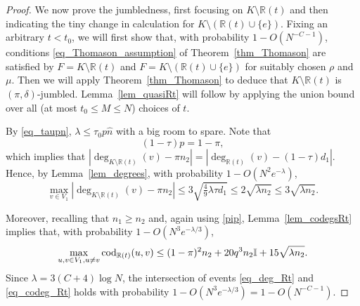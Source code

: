 \documentclass[12pt,reqno]{amsart}
\newcommand{\R} {\mathbb R}
\newcommand{\I} {\mathbb I}
\newcommand{\cod}{\operatorname{cod}}
\theoremstyle{definition}
\begin{document}
\begin{proof}
\smallskip
We now prove the jumbledness, first focusing on $K \setminus \R(t)$ and then indicating the tiny change in calculation for $K \setminus (\R(t) \cup \{e\})$. Fixing an arbitrary $t < t_0$, we will first show that, with probability $1 - O(N^{-C -1})$, conditions \eqref{eq_Thomason_assumption} of Theorem~\ref{thm_Thomason} are satisfied by $F = K \setminus \R(t)$ and $F = K \setminus (\R(t) \cup \{e\})$ for suitably chosen $\rho$ and $\mu$. Then we will apply Theorem~\ref{thm_Thomason} to deduce that $K \setminus \R(t)$ is $(\pi, \delta)$-jumbled.
Lemma~\ref{lem_quasiRt} will follow by applying the union bound over all (at most $t_0\le M\le N$) choices of $t$.


By \eqref{eq_taupn},  $\lambda \le \tau_0 p \hat n$ with a big room to spare.
Note that \begin{equation}
  \label{pip}
  (1-\tau)p = 1 - \pi,
\end{equation}
which implies that  $|\deg_{K \setminus \R(t)}(v) - \pi n_2|=|\deg_{\R(t)}(v) - (1-\tau)d_1|$.
Hence, by Lemma~\ref{lem_degrees}, with probability $1 - O(N^2e^{-\lambda})$,
\begin{equation}
  \label{eq_deg_Rt}
  \max_{v \in V_1} |\deg_{K \setminus \R(t)}(v) - \pi n_2|
  \le 3\sqrt{\tfrac{4}{9}\lambda\tau d_1} \le 2\sqrt{\lambda n_2}
    \le 3\sqrt{\lambda n_2}.
\end{equation}

Moreover, recalling that $n_1\ge n_2$ and, again using \eqref{pip},
	Lemma~\ref{lem_codegsRt} implies  that, with probability $1 - O(N^3e^{-\lambda/3})$,
	\begin{equation}
	  \label{eq_codeg_Rt}
	  \max_{u, v \in V_1, u \ne v} \cod_{\R(t)}(u,v) \le (1 - \pi)^2 n_2 + 20q^3n_2\I + \constcodegsRt \sqrt{\lambda n_2}.
	\end{equation}
	Since $\lambda = 3(C + 4)\log N$, the intersection of events \eqref{eq_deg_Rt} and \eqref{eq_codeg_Rt} holds with probability $1 - O(N^3e^{-\lambda/3}) = 1 - O(N^{-C - 1})$.
	

\end{proof}
\end{document}
